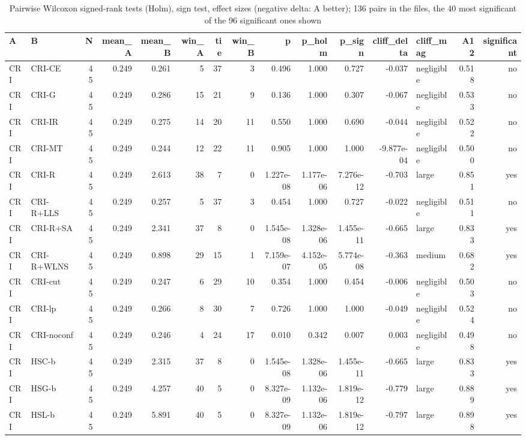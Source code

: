 \begin{table}[htbp]
\centering
\small
\caption{Pairwise Wilcoxon signed-rank tests (Holm), sign test, effect sizes (negative delta: A better); 136 pairs in the files, the 40 most significant of the 96 significant ones shown}
\label{tab:E5_ablation_b10_pairwise}
\begin{tabular}{llrrrrrrrrrrlrr}
\toprule
A & B & N & mean\_A & mean\_B & win\_A & tie & win\_B & p & p\_holm & p\_sign & cliff\_delta & cliff\_mag & A12 & significant \\
\midrule
CRI & CRI-CE & 45 & 0.249 & 0.261 & 5 & 37 & 3 & 0.496 & 1.000 & 0.727 & -0.037 & negligible & 0.518 & no \\
CRI & CRI-G & 45 & 0.249 & 0.286 & 15 & 21 & 9 & 0.136 & 1.000 & 0.307 & -0.067 & negligible & 0.533 & no \\
CRI & CRI-IR & 45 & 0.249 & 0.275 & 14 & 20 & 11 & 0.550 & 1.000 & 0.690 & -0.044 & negligible & 0.522 & no \\
CRI & CRI-MT & 45 & 0.249 & 0.244 & 12 & 22 & 11 & 0.905 & 1.000 & 1.000 & -9.877e-04 & negligible & 0.500 & no \\
CRI & CRI-R & 45 & 0.249 & 2.613 & 38 & 7 & 0 & 1.227e-08 & 1.177e-06 & 7.276e-12 & -0.703 & large & 0.851 & yes \\
CRI & CRI-R+LLS & 45 & 0.249 & 0.257 & 5 & 37 & 3 & 0.454 & 1.000 & 0.727 & -0.022 & negligible & 0.511 & no \\
CRI & CRI-R+SA & 45 & 0.249 & 2.341 & 37 & 8 & 0 & 1.545e-08 & 1.328e-06 & 1.455e-11 & -0.665 & large & 0.833 & yes \\
CRI & CRI-R+WLNS & 45 & 0.249 & 0.898 & 29 & 15 & 1 & 7.159e-07 & 4.152e-05 & 5.774e-08 & -0.363 & medium & 0.682 & yes \\
CRI & CRI-cut & 45 & 0.249 & 0.247 & 6 & 29 & 10 & 0.354 & 1.000 & 0.454 & -0.006 & negligible & 0.503 & no \\
CRI & CRI-lp & 45 & 0.249 & 0.266 & 8 & 30 & 7 & 0.726 & 1.000 & 1.000 & -0.049 & negligible & 0.524 & no \\
CRI & CRI-noconf & 45 & 0.249 & 0.246 & 4 & 24 & 17 & 0.010 & 0.342 & 0.007 & 0.003 & negligible & 0.498 & no \\
CRI & HSC-b & 45 & 0.249 & 2.315 & 37 & 8 & 0 & 1.545e-08 & 1.328e-06 & 1.455e-11 & -0.665 & large & 0.833 & yes \\
CRI & HSG-b & 45 & 0.249 & 4.257 & 40 & 5 & 0 & 8.327e-09 & 1.132e-06 & 1.819e-12 & -0.779 & large & 0.889 & yes \\
CRI & HSL-b & 45 & 0.249 & 5.891 & 40 & 5 & 0 & 8.327e-09 & 1.132e-06 & 1.819e-12 & -0.797 & large & 0.898 & yes \\

\end{tabular}
\end{table}
